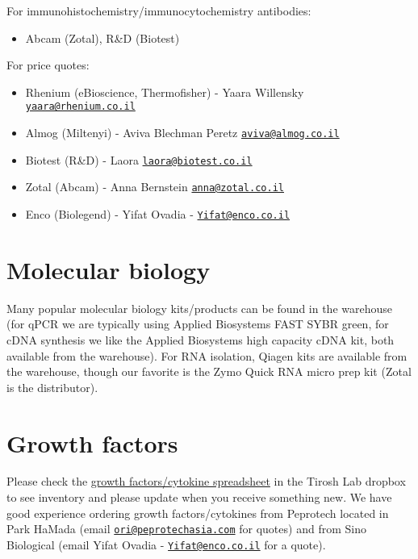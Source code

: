 \documentclass[]{book}
\providecommand{\tightlist}{%
  \setlength{\itemsep}{0pt}\setlength{\parskip}{0pt}}
\begin{document}
For immunohistochemistry/immunocytochemistry antibodies:

\begin{itemize}
\tightlist
\item
  Abcam (Zotal), R\&D (Biotest)
\end{itemize}

For price quotes:

\begin{itemize}
\tightlist
\item
  Rhenium (eBioscience, Thermofisher) - Yaara Willensky
  \href{mailto:yaara@rhenium.co.il}{\nolinkurl{yaara@rhenium.co.il}}
\item
  Almog (Miltenyi) - Aviva Blechman Peretz
  \href{mailto:aviva@almog.co.il}{\nolinkurl{aviva@almog.co.il}}
\item
  Biotest (R\&D) - Laora
  \href{mailto:laora@biotest.co.il}{\nolinkurl{laora@biotest.co.il}}
\item
  Zotal (Abcam) - Anna Bernstein
  \href{mailto:anna@zotal.co.il}{\nolinkurl{anna@zotal.co.il}}
\item
  Enco (Biolegend) - Yifat Ovadia -
  \href{mailto:Yifat@enco.co.il}{\nolinkurl{Yifat@enco.co.il}}
\end{itemize}

\section{Molecular biology}\label{molecular-biology}

Many popular molecular biology kits/products can be found in the
warehouse (for qPCR we are typically using Applied Biosystems FAST SYBR
green, for cDNA synthesis we like the Applied Biosystems high capacity
cDNA kit, both available from the warehouse). For RNA isolation, Qiagen
kits are available from the warehouse, though our favorite is the Zymo
Quick RNA micro prep kit (Zotal is the distributor).

\section{Growth factors}\label{growth-factors}

Please check the
\href{https://www.dropbox.com/s/q0dn3a3th12y822/cytokines_GFs_Tirosh.xlsx?dl=0}{growth
factors/cytokine spreadsheet} in the Tirosh Lab dropbox to see inventory
and please update when you receive something new. We have good
experience ordering growth factors/cytokines from Peprotech located in
Park HaMada (email
\href{mailto:ori@peprotechasia.com}{\nolinkurl{ori@peprotechasia.com}}
for quotes) and from Sino Biological (email Yifat Ovadia -
\href{mailto:Yifat@enco.co.il}{\nolinkurl{Yifat@enco.co.il}} for a
quote).
\end{document}
